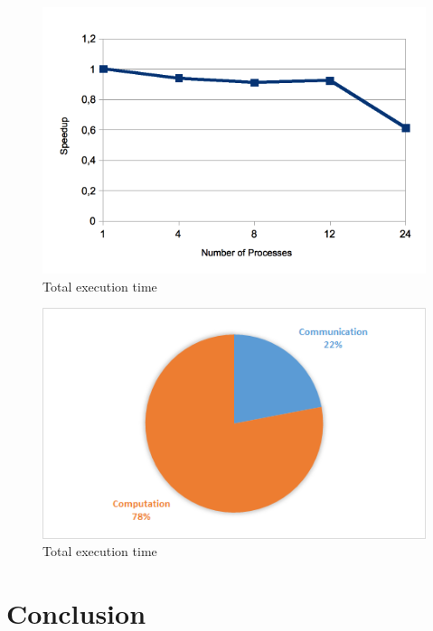 \documentclass[a4paper,10pt,openright,openbib,twocolumn]{article}
\begin{document}
\begin{figure}[H]
    \centering
    \begin{minipage}[t]{\columnwidth}
        \includegraphics[width=\textwidth]{../../../mpi/slides/images/speedup.png}
        \caption{Total execution time \label{fig:total}}
    \end{minipage}
\end{figure}

\begin{figure}[H]
    \centering
    \begin{minipage}[t]{\columnwidth}
        \includegraphics[width=\textwidth]{../../../mpi/slides/images/com.png}
        \caption{Total execution time \label{fig:total}}
    \end{minipage}
\end{figure}




\section{Conclusion}
\end{document}
